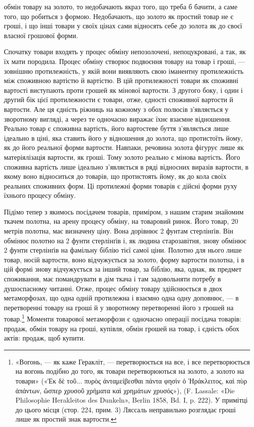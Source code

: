 \parcont{}  %
обмін товару на золото, то недобачають якраз того, що треба б
бачити, а саме того, що робиться з формою. Недобачають, що золото
як простий товар не є гроші, і що інші товари у своїх цінах
сами відносять себе до золота як до своєї власної грошової
форми.

Спочатку товари входять у процес обміну непозолочені, непоцукровані,
а так, як їх мати породила. Процес обміну створює
подвоєння товару на товар і гроші, — зовнішню протилежність,
у якій вони виявляють свою іманентну протилежність між споживною
вартістю й вартістю. В цій протилежності товари як
споживні вартості виступають проти грошей як мінової вартости.
З другого боку, і один і другий бік цієї протилежности
є товари, отже, єдності споживної вартости й вартости. Але ця
єдність ріжниць на кожному з обох полюсів з’являється у зворотному
вигляді, а через те одночасно виражає їхнє взаємне відношення.
Реально товар є споживна вартість, його вартостеве
буття з’являється лише ідеально в ціні, яка ставить його у відношення
до золота, що протистоїть йому, як до його реальної
форми вартости. Навпаки, речовина золота фігурує лише як матеріялізація
вартости, як гроші. Тому золото реально є мінова
вартість. Його споживна вартість лише ідеально з’являється в
ряді відносних виразів вартости, в якому воно відноситься до
товарів, що протистоять йому, як до кола своїх реальних споживних
форм. Ці протилежні форми товарів є дійсні форми руху
їхнього процесу обміну.

Підімо тепер з якимось посідачем товарів, приміром, з нашим
старим знайомим ткачем полотна, на арену процесу обміну, на
товаровий ринок. Його товар, 20 метрів полотна, має визначену
ціну. Вона дорівнює 2 фунтам стерлінґів. Він обмінює полотно
на 2 фунти стерлінґів і, як людина старозавітня, знову обмінює
2 фунти стерлінґів на фамільну біблію тієї самої ціни. Полотно
для нього лише товар, носій вартости, воно відчужується за
золото, форму вартости полотна, і в цій формі знову відчужується
за інший товар, за біблію, яка, однак, як предмет споживання,
має помандрувати в дім ткача і там задовольняти потребу
в душоспасному читанні. Отже, процес обміну товару здійснюється
в двох метаморфозах, що одна одній протилежна і взаємно
одна одну доповнює, — в перетворенні товару на гроші й у зворотному
перетворенні його з грошей на товар.\footnote{
«Вогонь, — як каже Геракліт, — перетворюється на все, і все
перетворюється на вогонь подібно до того, як товари перетворюються на
золото, а золото на товари» («Ἐκ δὲ τοῦ... πυρὸς ἀνταμείβεσθαι πάντα φησὶν ὁ Ἡράκλειτος, καὶ πὺρ
ἁπάντων, ὥσπερ χρυσοῦ χρήματα καὶ χρημάτων χρυσός»), (F. Lassale:
«Die Philosophie Herakleitos des Dunkeln», Berlin 1858, Bd. I, p. 222).
У примітці до цього місця (стор. 224, прим. 3) Ляссаль неправильно розглядає
гроші лише як простий знак вартости.
} Моменти товарової
метаморфози є одночасно операції посідача товарів: продаж,
обмін товару на гроші, купівля, обмін грошей на товар,
і єдність обох актів: продаж, щоб купити.
